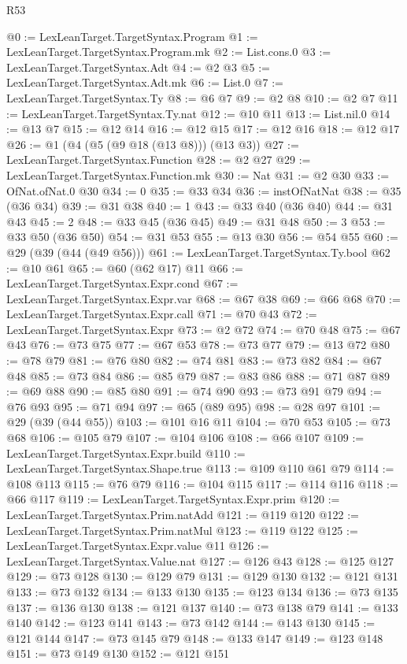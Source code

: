 \begin{lexlean}{R53}
\begin{coremodule}
@0 := LexLeanTarget.TargetSyntax.Program
@1 := LexLeanTarget.TargetSyntax.Program.mk
@2 := List.cons.{0}
@3 := LexLeanTarget.TargetSyntax.Adt
@4 := @2 @3
@5 := LexLeanTarget.TargetSyntax.Adt.mk
@6 := List.{0}
@7 := LexLeanTarget.TargetSyntax.Ty
@8 := @6 @7
@9 := @2 @8
@10 := @2 @7
@11 := LexLeanTarget.TargetSyntax.Ty.nat
@12 := @10 @11
@13 := List.nil.{0}
@14 := @13 @7
@15 := @12 @14
@16 := @12 @15
@17 := @12 @16
@18 := @12 @17
@26 := @1 (@4 (@5 (@9 @18 (@13 @8))) (@13 @3))
@27 := LexLeanTarget.TargetSyntax.Function
@28 := @2 @27
@29 := LexLeanTarget.TargetSyntax.Function.mk
@30 := Nat
@31 := @2 @30
@33 := OfNat.ofNat.{0} @30
@34 := 0
@35 := @33 @34
@36 := instOfNatNat
@38 := @35 (@36 @34)
@39 := @31 @38
@40 := 1
@43 := @33 @40 (@36 @40)
@44 := @31 @43
@45 := 2
@48 := @33 @45 (@36 @45)
@49 := @31 @48
@50 := 3
@53 := @33 @50 (@36 @50)
@54 := @31 @53
@55 := @13 @30
@56 := @54 @55
@60 := @29 (@39 (@44 (@49 @56)))
@61 := LexLeanTarget.TargetSyntax.Ty.bool
@62 := @10 @61
@65 := @60 (@62 @17) @11
@66 := LexLeanTarget.TargetSyntax.Expr.cond
@67 := LexLeanTarget.TargetSyntax.Expr.var
@68 := @67 @38
@69 := @66 @68
@70 := LexLeanTarget.TargetSyntax.Expr.call
@71 := @70 @43
@72 := LexLeanTarget.TargetSyntax.Expr
@73 := @2 @72
@74 := @70 @48
@75 := @67 @43
@76 := @73 @75
@77 := @67 @53
@78 := @73 @77
@79 := @13 @72
@80 := @78 @79
@81 := @76 @80
@82 := @74 @81
@83 := @73 @82
@84 := @67 @48
@85 := @73 @84
@86 := @85 @79
@87 := @83 @86
@88 := @71 @87
@89 := @69 @88
@90 := @85 @80
@91 := @74 @90
@93 := @73 @91 @79
@94 := @76 @93
@95 := @71 @94
@97 := @65 (@89 @95)
@98 := @28 @97
@101 := @29 (@39 (@44 @55))
@103 := @101 @16 @11
@104 := @70 @53
@105 := @73 @68
@106 := @105 @79
@107 := @104 @106
@108 := @66 @107
@109 := LexLeanTarget.TargetSyntax.Expr.build
@110 := LexLeanTarget.TargetSyntax.Shape.true
@113 := @109 @110 @61 @79
@114 := @108 @113
@115 := @76 @79
@116 := @104 @115
@117 := @114 @116
@118 := @66 @117
@119 := LexLeanTarget.TargetSyntax.Expr.prim
@120 := LexLeanTarget.TargetSyntax.Prim.natAdd
@121 := @119 @120
@122 := LexLeanTarget.TargetSyntax.Prim.natMul
@123 := @119 @122
@125 := LexLeanTarget.TargetSyntax.Expr.value @11
@126 := LexLeanTarget.TargetSyntax.Value.nat
@127 := @126 @43
@128 := @125 @127
@129 := @73 @128
@130 := @129 @79
@131 := @129 @130
@132 := @121 @131
@133 := @73 @132
@134 := @133 @130
@135 := @123 @134
@136 := @73 @135
@137 := @136 @130
@138 := @121 @137
@140 := @73 @138 @79
@141 := @133 @140
@142 := @123 @141
@143 := @73 @142
@144 := @143 @130
@145 := @121 @144
@147 := @73 @145 @79
@148 := @133 @147
@149 := @123 @148
@151 := @73 @149 @130
@152 := @121 @151

\end{coremodule}
\end{lexlean}
